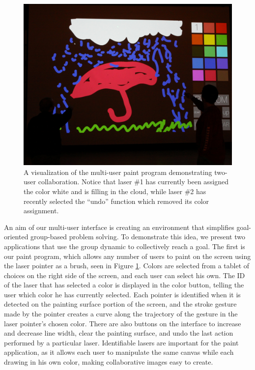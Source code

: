 \documentclass[review]{vgtc}                 %
\begin{document}
\begin{figure}[t]
  \begin{center}
  \begin{minipage}{0.99\linewidth}
    \includegraphics[width=0.99\linewidth]{images/paint.jpg}   
  \end{minipage}
  \end{center}
  \caption{\label{figure:paint}A visualization of the multi-user paint program demonstrating two-user collaboration. 
Notice that laser \#1 has currently been assigned the color white and is filling in the cloud, while laser \#2 has 
recently selected the ``undo'' function which removed its color assignment.}
\end{figure}

An aim of our multi-user interface is creating an environment that
simplifies goal-oriented group-based problem solving. To demonstrate
this idea, we present two applications that use the group dynamic to
collectively reach a goal. The first is our paint program, which
allows any number of users to paint on the screen using the laser
pointer as a brush, seen in Figure \ref{figure:paint}. Colors are
selected from a tablet of choices on the right side of the screen, and
each user can select his own. The ID of the laser that has selected a
color is displayed in the color button, telling the user which color
he has currently selected. Each pointer is identified when it is
detected on the painting surface portion of the screen, and the stroke
gesture made by the pointer creates a curve along the trajectory of
the gesture in the laser pointer's chosen color. There are also
buttons on the interface to increase and decrease line width, clear
the painting surface, and undo the last action performed by a
particular laser. Identifiable lasers are important for the paint
application, as it allows each user to manipulate the same canvas
while each drawing in his own color, making collaborative images easy
to create.
\end{document}

